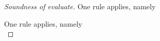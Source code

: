 \begin{proof}[Soundness of evaluate]
    {One rule applies, namely \\
  }

    {
    }

    {One rule applies, namely \\

}
\end{proof}
